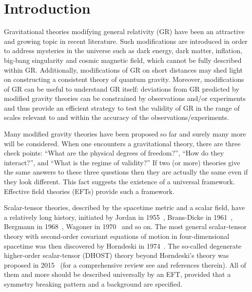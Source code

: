 \documentclass[a4paper,11pt]{article}
\numberwithin{equation}{section}
\begin{document}
\flushbottom

\vspace{1cm}



\section{Introduction}


Gravitational theories modifying general relativity (GR) have been an attractive and growing topic in recent literature. Such modifications are introduced in order to address mysteries in the universe such as dark energy, dark matter, inflation, big-bang singularity and cosmic magnetic field, which cannot be fully described within GR. Additionally, modifications of GR on short distances may shed light on constructing a consistent theory of quantum gravity. Moreover, modifications of GR can be useful to understand GR itself: deviations from GR predicted by modified gravity theories can be constrained by observations and/or experiments and thus provide an efficient strategy to test the validity of GR in the range of scales relevant to and within the accuracy of the observations/experiments.

Many modified gravity theories have been proposed so far and surely many more will be considered. When one encounters a gravitational theory, there are three check points: ``What are the physical degrees of freedom?'', ``How do they interact?'', and ``What is the regime of validity?'' If two (or more) theories give the same answers to these three questions then they are actually the same even if they look different. This fact suggests the existence of a universal framework. Effective field theories (EFTs) provide such a framework. 

Scalar-tensor theories, described by the spacetime metric and a scalar field, have a relatively long history, initiated by Jordan in 1955~\cite{jordan1955schwerkraft}, Brans-Dicke in 1961~\cite{Brans:1961sx}, Bergmann in 1968~\cite{Bergmann:1968ve}, Wagoner in 1970~\cite{Wagoner:1970vr} and so on. The most general scalar-tensor theory with second-order covariant equations of motion in four-dimensional spacetime was then discovered by Horndeski in 1974~\cite{Horndeski:1974wa}. The so-called degenerate higher-order scalar-tensor (DHOST) theory beyond Horndeski's theory was proposed in 2015~\cite{Langlois:2015cwa} (for a comprehensive review see \cite{Langlois:2018dxi} and references therein). All of them and more should be described universally by an EFT, provided that a symmetry breaking pattern and a background are specified. 
\end{document}
